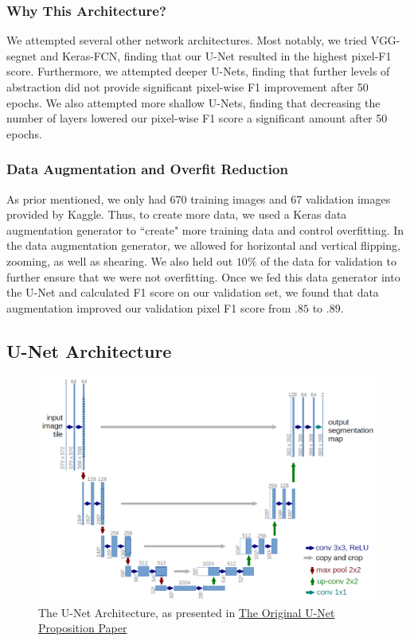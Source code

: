 \documentclass[paper=letter, fontsize=12pt]{article}
\numberwithin{equation}{section} %
\numberwithin{figure}{section} %
\numberwithin{table}{section} %
\begin{document}
\subsubsection{Why This Architecture?}
We attempted several other network architectures. Most notably, we tried
VGG-segnet and Keras-FCN, finding that our U-Net resulted in the highest
pixel-F1 score. Furthermore, we attempted deeper U-Nets, finding that further
levels of abstraction did not provide significant pixel-wise F1 improvement
after 50 epochs. We also attempted more shallow U-Nets, finding that
decreasing the number of layers lowered our pixel-wise F1 score a significant
amount after 50 epochs.

\subsubsection{ Data Augmentation and Overfit Reduction }
As prior mentioned, we only had 670 training images and 67 validation images provided by Kaggle.
Thus, to create more data, we used a Keras data augmentation generator to ``create" more training data
and control overfitting. In the data augmentation generator, we allowed for horizontal and
vertical flipping, zooming, as well as shearing. We also held out $10\%$ of the data for validation
to further ensure that we were not overfitting. Once we fed this data generator into the U-Net and
calculated F1 score on our validation set, we found that data augmentation improved our validation
pixel F1 score from $.85$ to $.89$.

\begin{appendixatend}
    \subsection{U-Net Architecture}
    \begin{figure}
        \centering
        \includegraphics[width=\textwidth]{./figs/unet_architecture.png}
        \caption{The U-Net Architecture, as presented in  \href{https://arxiv.org/pdf/1505.04597.pdf}{The Original U-Net Proposition Paper} }
        \label{fig:U-Net-architecture}
    \end{figure}
\end{appendixatend}
\end{document}
